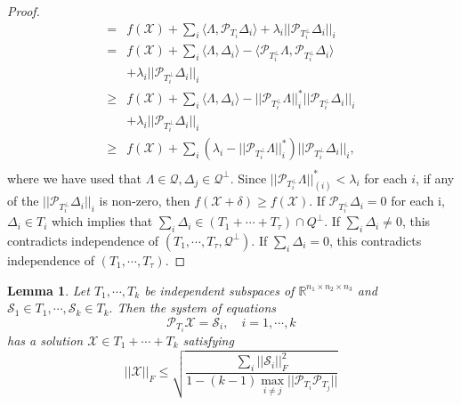 \documentclass[journal,transmag]{IEEEtran}
\newtheorem{lemma}{Lemma}[section]
\theoremstyle{plain}
\begin{document}
\begin{proof}
\begin{equation}
\begin{split}
 = &f(\mathcal{X}) + \sum_i \langle\Lambda, \mathcal{P}_{T_i}\Delta_i\rangle + \lambda_i ||\mathcal{P}_{T_i^{\bot}}\Delta_i||_{i} \\
 = &f(\mathcal{X}) + \sum_i \langle\Lambda, \Delta_i\rangle - \langle\mathcal{P}_{T_i^{\bot}}\Lambda, \mathcal{P}_{T_i^{\bot}}\Delta_i\rangle \\
& + \lambda_i ||\mathcal{P}_{T_i^{\bot}}\Delta_i||_{i} \\
\ge & f(\mathcal{X}) + \sum_i \langle\Lambda, \Delta_i\rangle - ||\mathcal{P}_{T_i^{\bot}}\Lambda||^*_{i} ||\mathcal{P}_{T_i^{\bot}}\Delta_i||_{i} \\
& + \lambda_i ||\mathcal{P}_{T_i^{\bot}}\Delta_i||_{i} \\
\ge &f(\mathcal{X}) + \sum_i (\lambda_i - ||\mathcal{P}_{T_i^{\bot}}\Lambda||^*_{i}) ||\mathcal{P}_{T_i^{\bot}}\Delta_i||_{i}, \\
\end{split}
\end{equation}
where we have used that $\Lambda \in \mathcal{Q}, \Delta_j \in \mathcal{Q}^{\bot}$. Since $||\mathcal{P}_{T_i^{\bot}}\Lambda||_{(i)}^* < \lambda_i$ for each $i$, if any of the $||\mathcal{P}_{T_i^{\bot}}\Delta_i||_{i}$ is non-zero, then $f(\mathcal{X}+\delta)\ge f(\mathcal{X}).$ If $\mathcal{P}_{T_i^{\bot}}\Delta_i = 0$ for each i, $\Delta_i \in T_i$ which implies that $\sum_i \Delta_i \in (T_1 + \cdots + T_{\tau})\cap Q^{\bot}$. If $\sum_i \Delta_i \neq 0$, this contradicts independence of $(T_1,\cdots,T_{\tau},\mathcal{Q}^{\bot}).$ If $\sum_i \Delta_i = 0$, this contradicts independence of $(T_1,\cdots,T_{\tau}).$
\end{proof}

\begin{lemma}  \label{system}
Let $T_1,\cdots,T_k$ be independent subspaces of $\mathbb{R}^{n_1\times n_2\times n_3}$ and $\mathcal{S}_1 \in T_1,\cdots,\mathcal{S}_k \in T_k.$ Then the system of equations
\begin{equation}
{\mathcal{P}_{T_i}\mathcal{X}=\mathcal{S}_i,\quad i=1,\cdots,k}
\end{equation}
has a solution $\mathcal{X}\in T_1 +\cdots+T_k $ satisfying
\begin{equation}\label{sys}
{ ||\mathcal{X}||_F \le \sqrt{\frac{\sum_i ||\mathcal{S}_i||^2_F}{1-(k-1)\max_{i\not=j}||\mathcal{P}_{T_i}\mathcal{P}_{T_j}||}} }
\end{equation}
\end{lemma}
\end{document}
